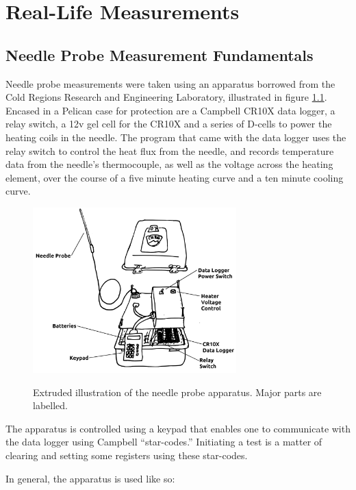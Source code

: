 \chapter{Real-Life Measurements}
\label{ch:irl}
\section{Needle Probe Measurement Fundamentals}

Needle probe measurements were taken using an apparatus borrowed from the Cold
Regions Research and Engineering Laboratory, illustrated in figure
\ref{fig:apparatus}. Encased in a Pelican case for protection are a Campbell
CR10X data logger, a relay switch, a 12v gel cell for the CR10X and a series of
D-cells to power the heating coils in the needle. The program that came with the
data logger uses the relay switch to control the heat flux from the needle, and
records temperature data from the needle's thermocouple, as well as the voltage
across the heating element, over the course of a five minute heating curve and
a ten minute cooling curve.

\begin{figure}[h]
\centering
\includegraphics[width=0.7\textwidth]{fig/apparatus.png}
\label{fig:apparatus}
\caption{Extruded illustration of the needle probe apparatus. Major parts are labelled.}
\end{figure}

The apparatus is controlled using a keypad that enables one to communicate
with the data logger using Campbell ``star-codes.'' Initiating a test is a
matter of clearing and setting some registers using these star-codes.


In general, the apparatus is used like so:


